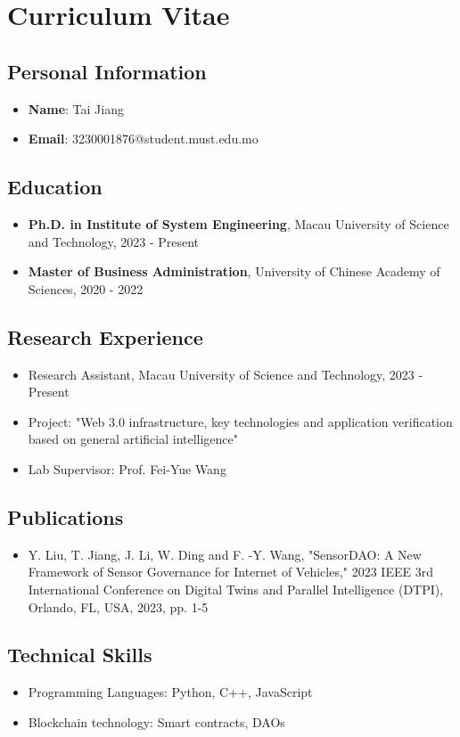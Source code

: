 \section*{Curriculum Vitae}
\subsection*{Personal Information}
\begin{itemize}
  \item \textbf{Name}: Tai Jiang
  \item \textbf{Email}: 3230001876@student.must.edu.mo
\end{itemize}

\subsection*{Education}
\begin{itemize}
  \item \textbf{Ph.D. in Institute of System Engineering}, Macau University of Science and Technology, \hfill 2023 - Present
  \item \textbf{Master of Business Administration}, University of Chinese Academy of Sciences, \hfill 2020 - 2022
\end{itemize}

\subsection*{Research Experience}
\begin{itemize}
  \item Research Assistant, Macau University of Science and Technology, \hfill 2023 - Present
  \item Project: "Web 3.0 infrastructure, key technologies and application verification based on general artificial intelligence"
  \item Lab Supervisor: Prof. Fei-Yue Wang
\end{itemize}

\subsection*{Publications}
\begin{itemize}
  \item Y. Liu, T. Jiang, J. Li, W. Ding and F. -Y. Wang, "SensorDAO: A New Framework of Sensor Governance for Internet of Vehicles," 2023 IEEE 3rd International Conference on Digital Twins and Parallel Intelligence (DTPI), Orlando, FL, USA, 2023, pp. 1-5
\end{itemize}

\subsection*{Technical Skills}
\begin{itemize}
  \item Programming Languages: Python, C++, JavaScript
  \item Blockchain technology: Smart contracts, DAOs
\end{itemize}

